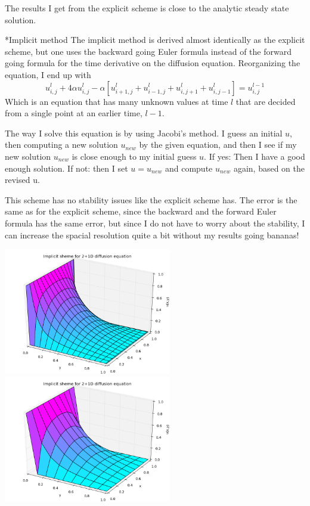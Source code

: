 \documentclass[a4paper, 12pt, titlepage]{article}
\newcommand{\beq}{\begin{equation*}}
\newcommand{\eeq}{\end{equation*}}
\begin{document}
\begin{section}
\begin{subsection}
    The results I get from the explicit scheme is close to the analytic steady state solution. 
    
 \end{subsection}
  \begin{subsection}*{Implicit method}
   The implicit method is derived almost identically as the explicit scheme, but one uses the backward going
   Euler formula instead of the forward going formula for the time derivative on the diffusion equation.
   Reorganizing the equation, I end up with
   \beq u_{i,j}^l + 4\alpha u_{i,j}^l - \alpha[u_{i+1,j}^l + u_{i-1,j}^l + u_{i,j+1}^l + u_{i,j-1}^l] = u_{i,j}^{l-1} \eeq
   Which is an equation that has many unknown values at time $l$ that are decided from a single point at
   an earlier time, $l-1$. 
   
   The way I solve this equation is by using Jacobi's method. I guess an initial $u$, then computing a new 
   solution $u_{new}$ by the given equation, and then I see if my new solution $u_{new}$ is close enough to 
   my initial guess $u$. If yes: Then I have a good enough solution. If not: then I set $u = u_{new}$ and 
   compute $u_{new}$ again, based on the revised u. 
   
   This scheme has no stability issues like the explicit scheme has. The error is the same as for the 
   explicit scheme, since the backward and the forward Euler formula has the same error, but since I do
   not have to worry about the stability, I can increase the spacial resolution quite a bit without my 
   results going bananas! 
   
    \includegraphics[width=0.55\textwidth]{build-main-Desktop-Debug/Implicit100_100.png}
    \includegraphics[width=0.55\textwidth]{build-main-Desktop-Debug/Implicit10_1000.png}
    

\end{subsection}
\end{section}
\end{document}
